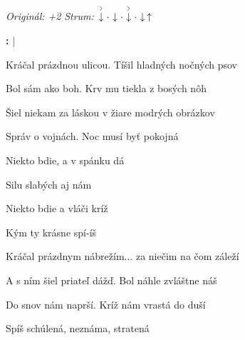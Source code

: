 \begin{song}


\begin{headerbox}
\RaiseBoxWithAccents
\textit{Originál: +2} \quad
\textit{Strum:} $\AccentDown\Miss\Down\Miss\AccentDown\Miss\Down\Up$
\end{headerbox}

\begin{hchordbox}
\end{hchordbox}

\Large

\bigskip

\Intro\textbf{:}     |     \par

\bigskip

Kráčal prázdnou ulicou. Tíšil hladných nočných psov \par
Bol sám  ako boh. Krv mu tiekla z bosých nôh \par

\bigskip

 Šiel niekam za láskou v žiare modrých obrázkov \par
{}Správ  o vojnách. Noc musí byť pokojná \par

\bigskip

Niekto bdie, a v spánku dá \par
{} Silu slabých aj nám \par
{} Niekto bdie a vláči kríž \par
{} Kým ty krásne spí-íš  \par

\bigskip

Kráčal prázdnym nábrežím... za niečim na čom záleží \par
A s ním šiel priateľ dážď. Bol náhle zvláštne náš \par

\bigskip

 Do snov nám naprší. Kríž nám vrastá  do duší \par
{}Spíš schúlená, neznáma, stratená \par


\end{song}
